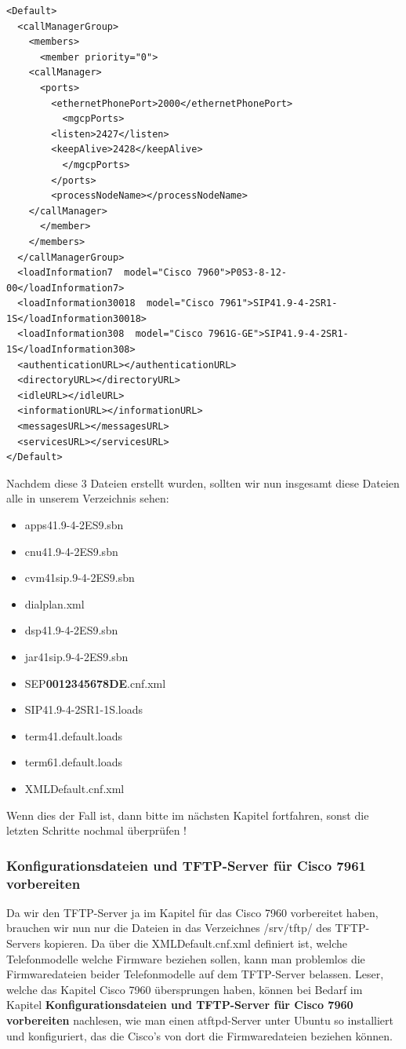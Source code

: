 \documentclass[a4paper,12pt]{scrbook}
\begin{document}
\begin{lstlisting}[caption={XMLDefault.cnf.xml für Cisco 7960 und 7961 gültig}, label=lst:xmldefaultcnfcml79607961]    
<Default>
  <callManagerGroup>
    <members>
      <member priority="0">
	<callManager>
	  <ports>
	    <ethernetPhonePort>2000</ethernetPhonePort>
	      <mgcpPorts>
		<listen>2427</listen>
		<keepAlive>2428</keepAlive>
	      </mgcpPorts>
	    </ports>
	    <processNodeName></processNodeName>
	</callManager>
      </member>
    </members>
  </callManagerGroup>
  <loadInformation7  model="Cisco 7960">P0S3-8-12-00</loadInformation7>
  <loadInformation30018  model="Cisco 7961">SIP41.9-4-2SR1-1S</loadInformation30018>
  <loadInformation308  model="Cisco 7961G-GE">SIP41.9-4-2SR1-1S</loadInformation308>
  <authenticationURL></authenticationURL>
  <directoryURL></directoryURL>
  <idleURL></idleURL>
  <informationURL></informationURL>
  <messagesURL></messagesURL>
  <servicesURL></servicesURL>
</Default>
\end{lstlisting}

Nachdem diese 3 Dateien erstellt wurden, sollten wir nun insgesamt diese Dateien alle in unserem Verzeichnis sehen:
\begin{itemize}
 \item apps41.9-4-2ES9.sbn  
 \item cnu41.9-4-2ES9.sbn
 \item cvm41sip.9-4-2ES9.sbn
 \item dialplan.xml
 \item dsp41.9-4-2ES9.sbn
 \item jar41sip.9-4-2ES9.sbn
 \item SEP\textbf{0012345678DE}.cnf.xml
 \item SIP41.9-4-2SR1-1S.loads
 \item term41.default.loads
 \item term61.default.loads
 \item XMLDefault.cnf.xml
\end{itemize}
Wenn dies der Fall ist, dann bitte im nächsten Kapitel fortfahren, sonst die letzten Schritte nochmal überprüfen !

\subsubsection{Konfigurationsdateien und TFTP-Server für Cisco 7961 vorbereiten}
Da wir den TFTP-Server ja im Kapitel für das Cisco 7960 vorbereitet haben, brauchen wir nun nur die Dateien in das Verzeichnes /srv/tftp/ des TFTP-Servers kopieren.
Da über die XMLDefault.cnf.xml definiert ist, welche Telefonmodelle welche Firmware beziehen sollen, kann man problemlos die Firmwaredateien beider Telefonmodelle auf 
dem TFTP-Server belassen. Leser, welche das Kapitel Cisco 7960 übersprungen haben, können bei Bedarf im Kapitel \textbf{Konfigurationsdateien und TFTP-Server für Cisco 7960 vorbereiten}
nachlesen, wie man einen atftpd-Server unter Ubuntu so installiert und konfiguriert, das die Cisco's von dort die Firmwaredateien beziehen können.
\end{document}
